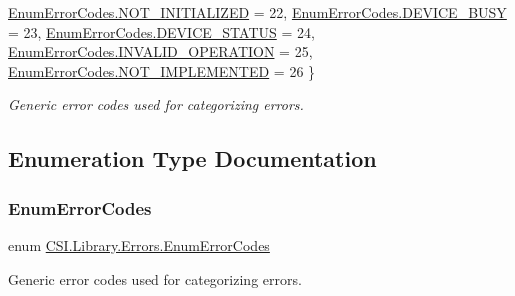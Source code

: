 \begin{DoxyCompactItemize}
\mbox{\hyperlink{namespace_c_s_i_1_1_library_1_1_errors_a5534735de1ef2256eb4c52c7440e30d7a02de9649e258d1dd94056e676061e969}{Enum\+Error\+Codes.\+N\+O\+T\+\_\+\+I\+N\+I\+T\+I\+A\+L\+I\+Z\+ED}} = 22, 
\newline
\mbox{\hyperlink{namespace_c_s_i_1_1_library_1_1_errors_a5534735de1ef2256eb4c52c7440e30d7a9b40004e356bbecf8c222684be0988c7}{Enum\+Error\+Codes.\+D\+E\+V\+I\+C\+E\+\_\+\+B\+U\+SY}} = 23, 
\mbox{\hyperlink{namespace_c_s_i_1_1_library_1_1_errors_a5534735de1ef2256eb4c52c7440e30d7a97563a7d5b9ad61292ad2f7a53e50856}{Enum\+Error\+Codes.\+D\+E\+V\+I\+C\+E\+\_\+\+S\+T\+A\+T\+US}} = 24, 
\mbox{\hyperlink{namespace_c_s_i_1_1_library_1_1_errors_a5534735de1ef2256eb4c52c7440e30d7ade918d7abaea4c856c3c64720f3cbb7c}{Enum\+Error\+Codes.\+I\+N\+V\+A\+L\+I\+D\+\_\+\+O\+P\+E\+R\+A\+T\+I\+ON}} = 25, 
\mbox{\hyperlink{namespace_c_s_i_1_1_library_1_1_errors_a5534735de1ef2256eb4c52c7440e30d7a3e860a081575fc82cc7b6ed2ca602947}{Enum\+Error\+Codes.\+N\+O\+T\+\_\+\+I\+M\+P\+L\+E\+M\+E\+N\+T\+ED}} = 26
 \}
\begin{DoxyCompactList}\small\item\em Generic error codes used for categorizing errors. \end{DoxyCompactList}\end{DoxyCompactItemize}


\subsection{Enumeration Type Documentation}
\mbox{\label{namespace_c_s_i_1_1_library_1_1_errors_a5534735de1ef2256eb4c52c7440e30d7}} 
\subsubsection{\texorpdfstring{EnumErrorCodes}{EnumErrorCodes}}
{\footnotesize\ttfamily enum \mbox{\hyperlink{namespace_c_s_i_1_1_library_1_1_errors_a5534735de1ef2256eb4c52c7440e30d7}{C\+S\+I.\+Library.\+Errors.\+Enum\+Error\+Codes}}\hspace{0.3cm}{\ttfamily [strong]}}



Generic error codes used for categorizing errors. 

